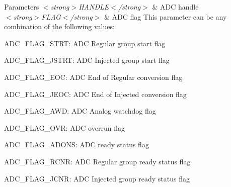 \begin{DoxyParams}{Parameters}
{\em $<$strong$>$\-H\-A\-N\-D\-L\-E$<$/strong$>$} & A\-D\-C handle \\
\hline
{\em $<$strong$>$\-F\-L\-A\-G$<$/strong$>$} & A\-D\-C flag This parameter can be any combination of the following values\-: \begin{DoxyItemize}
\item A\-D\-C\-\_\-\-F\-L\-A\-G\-\_\-\-S\-T\-R\-T\-: A\-D\-C Regular group start flag \item A\-D\-C\-\_\-\-F\-L\-A\-G\-\_\-\-J\-S\-T\-R\-T\-: A\-D\-C Injected group start flag \item A\-D\-C\-\_\-\-F\-L\-A\-G\-\_\-\-E\-O\-C\-: A\-D\-C End of Regular conversion flag \item A\-D\-C\-\_\-\-F\-L\-A\-G\-\_\-\-J\-E\-O\-C\-: A\-D\-C End of Injected conversion flag \item A\-D\-C\-\_\-\-F\-L\-A\-G\-\_\-\-A\-W\-D\-: A\-D\-C Analog watchdog flag \item A\-D\-C\-\_\-\-F\-L\-A\-G\-\_\-\-O\-V\-R\-: A\-D\-C overrun flag \item A\-D\-C\-\_\-\-F\-L\-A\-G\-\_\-\-A\-D\-O\-N\-S\-: A\-D\-C ready status flag \item A\-D\-C\-\_\-\-F\-L\-A\-G\-\_\-\-R\-C\-N\-R\-: A\-D\-C Regular group ready status flag \item A\-D\-C\-\_\-\-F\-L\-A\-G\-\_\-\-J\-C\-N\-R\-: A\-D\-C Injected group ready status flag \end{DoxyItemize}
\\
\hline
\end{DoxyParams}

